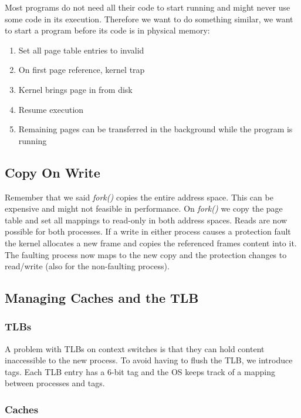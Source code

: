 Most programs do not need all their code to start running and might never use some code in its execution. Therefore we want to do something similar, we want to start a program before its code is in physical memory:
\begin{enumerate}
	\item Set all page table entries to invalid
	\item On first page reference, kernel trap
	\item Kernel brings page in from disk
	\item Resume execution
	\item Remaining pages can be transferred in the background while the program is running
\end{enumerate}


\subsection{Copy On Write}

Remember that we said \textit{fork()} copies the entire address space. This can be expensive and might not feasible in performance. On \textit{fork()} we copy the page table and set all mappings to read-only in both address spaces. Reads are now possible for both processes. If a write in either process causes a protection fault the kernel allocates a new frame and copies the referenced frames content into it. The faulting process now maps to the new copy and the protection changes to read/write (also for the non-faulting process).


\subsection{Managing Caches and the TLB}

\subsubsection{TLBs}

A problem with TLBs on context switches is that they can hold content inaccessible to the new process. To avoid having to flush the TLB, we introduce tags. Each TLB entry has a $6$-bit tag and the OS keeps track of a mapping between processes and tags. \medskip

\subsubsection{Caches}

